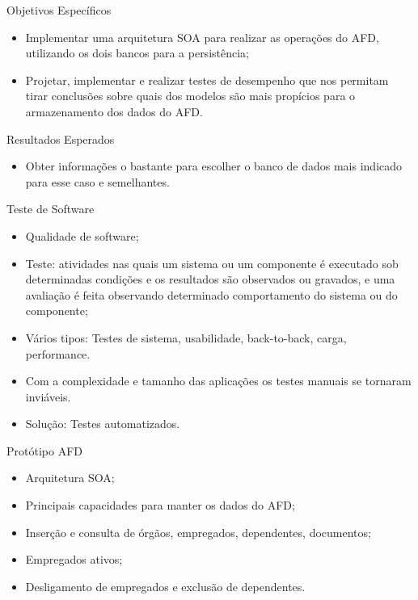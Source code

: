 \begin{frame}{Objetivos Específicos}
    \begin{itemize}
    \item Implementar uma arquitetura SOA para realizar as operações do AFD, utilizando os dois bancos para a persistência;
   \item Projetar, implementar e realizar testes de desempenho que nos permitam tirar conclusões sobre quais dos modelos são mais propícios para o armazenamento dos dados do AFD.
    \end{itemize}
\end{frame}

\begin{frame}{Resultados Esperados}
    \begin{itemize}
    \item Obter informações o bastante para escolher o banco de dados mais indicado para esse caso e semelhantes.
    \end{itemize}
\end{frame}


\begin{frame}{Teste de Software}
    \begin{itemize}
    \item Qualidade de software;
    \item Teste: atividades nas quais um sistema ou um componente é executado sob determinadas
condições e os resultados são observados ou gravados, e uma avaliação é
feita observando determinado comportamento do sistema ou do componente; 
    \item Vários tipos: Testes de sistema, usabilidade, back-to-back, carga, performance.
    \item Com a complexidade e tamanho das aplicações os testes manuais se tornaram inviáveis.
    \item Solução: Testes automatizados.
    \end{itemize}
\end{frame}

\begin{frame}{Protótipo AFD}
    \begin{itemize}
    \item Arquitetura SOA;
    \item Principais capacidades para manter os dados do AFD;
    \item Inserção e consulta de órgãos, empregados, dependentes, documentos;
    \item Empregados ativos;
    \item Desligamento de empregados e exclusão de dependentes.
    \end{itemize}
\end{frame}

